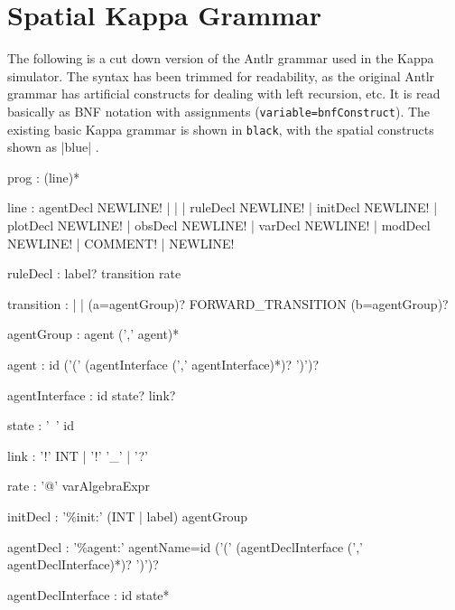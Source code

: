 \chapter{Spatial Kappa Grammar}
\label{chap:spatialGrammar}



The following is a cut down version of the Antlr grammar used in the Kappa simulator. The syntax has been trimmed for readability, as the original Antlr grammar has artificial constructs for dealing with left recursion, etc. It is read basically as BNF notation with assignments (\verb|variable=bnfConstruct|). The existing basic Kappa grammar is shown in \verb|black|, with the spatial constructs shown as |blue| . 


\begin{bnfsource}
prog :
  (line)*

line :
  agentDecl NEWLINE!
  | 
  | 
  | ruleDecl NEWLINE!
  | initDecl NEWLINE!
  | plotDecl NEWLINE!
  | obsDecl NEWLINE!
  | varDecl NEWLINE!
  | modDecl NEWLINE!
  | COMMENT!
  | NEWLINE!

ruleDecl :
  label? transition rate 

transition :
  | 
  | (a=agentGroup)? FORWARD_TRANSITION (b=agentGroup)?
  
agentGroup :
   agent (',' agent)*

agent :
  id  ('(' (agentInterface (',' agentInterface)*)? ')')?

agentInterface :
  id state? link?

state :
  '~' id

link :
  '!' INT 
  | '!' '_' 
  | '?'

rate :
  '@' varAlgebraExpr

initDecl :
  '\%init:' (INT | label) agentGroup

agentDecl :
  '\%agent:' agentName=id ('(' (agentDeclInterface (',' agentDeclInterface)*)? ')')?

agentDeclInterface :
  id state*




\end{bnfsource}
